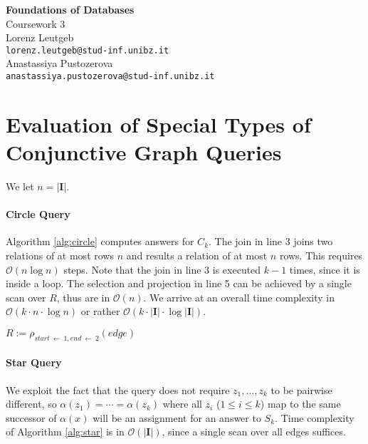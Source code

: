 \documentclass[a4paper,12pt]{article}
\newcommand{\dbi}{\ensuremath{\mathbf{I}}}
\newcommand{\bigo}{\ensuremath{\mathcal{O}}}
\begin{document}
\begin{center}
{\LARGE\bfseries Foundations of Databases}\\[3mm]

{\Large Coursework 3}\\[5mm]

Lorenz Leutgeb\\\texttt{lorenz.leutgeb@stud-inf.unibz.it}\\[2mm]
Anastassiya Pustozerova\\\texttt{anastassiya.pustozerova@stud-inf.unibz.it}
\end{center}

\section{Evaluation of Special Types of Conjunctive Graph Queries}

We let $n = |\dbi|$.

\paragraph{Circle Query}{
Algorithm \ref{alg:circle} computes answers for $C_k$. The join in line 3 joins two relations of at most rows $n$ and results a relation of at most $n$ rows. This requires $\bigo(n \log n)$ steps. Note that the join in line 3 is executed $k - 1$ times, since it is inside a loop. The selection and projection in line 5 can be achieved by a single scan over $R$, thus are in $\bigo(n)$. We arrive at an overall time complexity in $\bigo(k \cdot n \cdot \log n)$ or rather $\bigo(k \cdot |\dbi| \cdot \log |\dbi|)$.
\begin{algorithm}
	$R := \rho_{start \: \leftarrow\: 1, end\: \leftarrow\: 2}(edge)$\\
	\caption{$\mathsf{EvalCircle}(k)$}
	\label{alg:circle}
\end{algorithm}
}

\paragraph{Star Query}{
We exploit the fact that the query does not require $z_1, \ldots, z_k$ to be pairwise different, so $\alpha(z_1) = \cdots = \alpha(z_k)$ where all $z_i$ ($1 \leq i \leq k$) map to the same successor of $\alpha(x)$ will be an assignment for an answer to $S_k$. Time complexity of Algorithm \ref{alg:star} is in $\bigo(|\dbi|)$, since a single scan over all edges suffices.
\begin{algorithm}
\caption{$\mathsf{EvalStar}(k)$}
\label{alg:star}
\end{algorithm}
}
\end{document}
